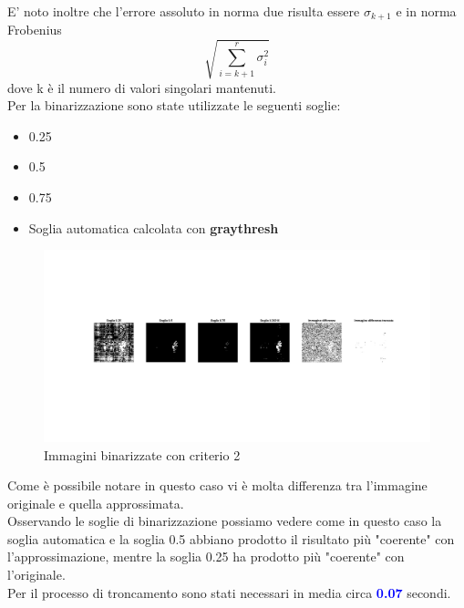 \noindent
E' noto inoltre che l'errore assoluto in norma due risulta essere $\sigma_{k+1}$ e in norma Frobenius 
\begin{equation}
    \sqrt{\sum_{i=k+1}^{r}\sigma_i^2}
\end{equation}
 dove k è il numero di valori singolari mantenuti.\\
Per la binarizzazione sono state utilizzate le seguenti soglie:
\begin{itemize}
    \item 0.25
    \item 0.5
    \item 0.75
    \item Soglia automatica calcolata con \textbf{graythresh}
\end{itemize}

\begin{figure}[H]
    \centering
     \includegraphics[width=\textwidth]{images/Criterio2.jpg}
    \caption{Immagini binarizzate con criterio 2}
\end{figure}

\noindent Come è possibile notare in questo caso vi è molta differenza tra l'immagine originale e quella approssimata.\\
Osservando le soglie di binarizzazione possiamo vedere come in questo caso la soglia automatica e la soglia 0.5 abbiano prodotto il risultato più "coerente" con l'approssimazione, mentre la soglia 0.25 ha prodotto più "coerente" con l'originale.\\

\noindent Per il processo di troncamento sono stati necessari in media circa \textcolor{blue}{\textbf{0.07}} secondi.\\



